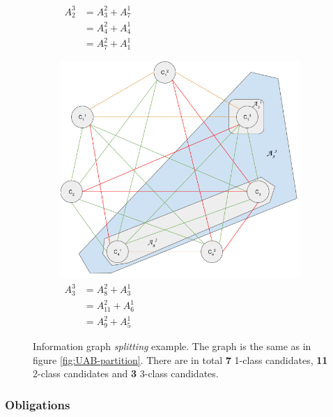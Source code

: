 \begin{figure}[h]
\begin{subfigure}[b]{\sfwidth}
    \caption[caption]{$\begin{aligned}
              A_2^3 &= A_3^2 + A_7^1\\
                    &= A_4^2 + A_4^1\\
                    &= A_7^2 + A_1^1
              \end{aligned}$}
  \end{subfigure}
  \begin{subfigure}[b]{\sfwidth}
    \includegraphics[width=\textwidth]{img/split-3-class_3.png}
    \caption[caption]{$\begin{aligned}
              A_3^3 &= A_8^2    + A_3^1\\
                    &= A_{11}^2 + A_6^1\\
                    &= A_9^2    + A_5^1
              \end{aligned}$}
  \end{subfigure}

  \caption{Information graph \emph{splitting} example. The graph is the same
           as in figure \ref{fig:UAB-partition}.
           There are in total \textbf{7}  1-class candidates,
                                    \textbf{11} 2-class candidates and
                                    \textbf{3}  3-class candidates.}
\end{figure}

\subsubsection{Obligations}

